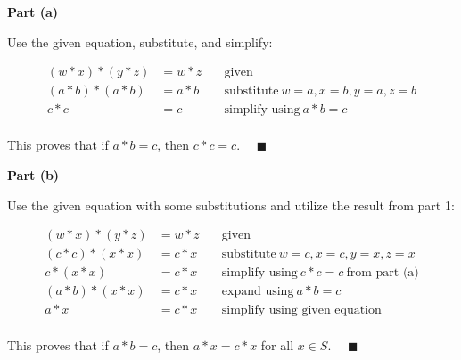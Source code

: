 \textbf{Part (a)}

Use the given equation, substitute, and simplify:

$$
\begin{aligned}
(w \ast x) \ast (y \ast z) & = w \ast z & \quad \text{given} \\
(a \ast b) \ast (a \ast b) & = a \ast b & \quad \text{substitute} \ w = a, x = b, y = a, z = b \\
c \ast c & = c & \quad \text{simplify using} \ a \ast b = c \\
\end{aligned}
$$

This proves that if $a \ast b = c$, then $c \ast c = c$. $\quad \blacksquare$

\textbf{Part (b)}

Use the given equation with some substitutions and utilize the result from part
1:

$$
\begin{aligned}
(w \ast x) \ast (y \ast z) & = w \ast z & \quad \text{given} \\
(c \ast c) \ast (x \ast x) & = c \ast x & \quad \text{substitute} \ w = c, x = c, y = x, z = x \\
c \ast (x \ast x) & = c \ast x & \quad \text{simplify using} \ c \ast c = c \ \text{from part (a)} \\
(a \ast b) \ast (x \ast x) & = c \ast x & \quad \text{expand using} \ a \ast b = c \\
a \ast x & = c \ast x & \quad \text{simplify using given equation} \\
\end{aligned}
$$

This proves that if $a \ast b = c$, then $a \ast x = c \ast x$ for all $x \in S$. $\quad \blacksquare$
